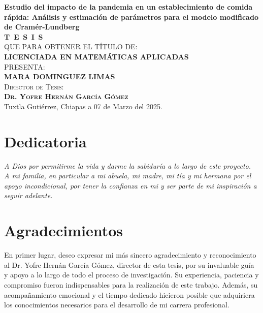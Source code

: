 \begin{titlepage}
\begin{minipage}[t][0.95\textheight][c]{0.76\textwidth}
            \begin{center}
                {\Large\bfseries Estudio del impacto de la pandemia en un establecimiento de comida rápida: Análisis y estimación de parámetros para el modelo modificado de Cramér-Lundberg}\\[2cm]
                \textsc{\huge \textbf{T\, E\, S\, I\, S}}\\[1.5cm]
                \textsc{\large QUE PARA OBTENER EL TÍTULO DE:}\\[0.3cm]
                \textbf{\textsc{LICENCIADA EN MATEMÁTICAS APLICADAS}}\\[1.5cm]
                \textsc{\large PRESENTA:}\\[0.3cm]
                \textbf{\textsc{\large {MARA DOMINGUEZ LIMAS}}}\\[2cm]
                {\large\scshape Director de Tesis:\\[0.3cm]
                {\textbf{\large Dr. Yofre Hernán García Gómez }}}\\[2.0cm]
                \large{Tuxtla Gutiérrez, Chiapas a 07 de Marzo del 2025.}

            \end{center}
\end{minipage}
\end{titlepage}

\pagebreak[2]

\chapter*{Dedicatoria}
\begin{flushright}
\textit{A Dios por permitirme la vida y darme la sabiduría a lo largo de este proyecto. \\
 A mi familia, en particular a mi abuela, mi madre, mi tía y mi hermana por el apoyo incondicional, por tener la confianza en mi y ser parte de mi inspiración a seguir adelante.}
 \end{flushright}

\chapter*{Agradecimientos}

En primer lugar, deseo expresar mi más sincero agradecimiento y reconocimiento al Dr. Yofre Hernán García Gómez, director de esta tesis, por su invaluable guía y apoyo a lo largo de todo el proceso de investigación. Su experiencia, paciencia y compromiso fueron indispensables para la realización de este trabajo. Además, su acompañamiento emocional y el tiempo dedicado hicieron posible que adquiriera los conocimientos necesarios para el desarrollo de mi carrera profesional.

